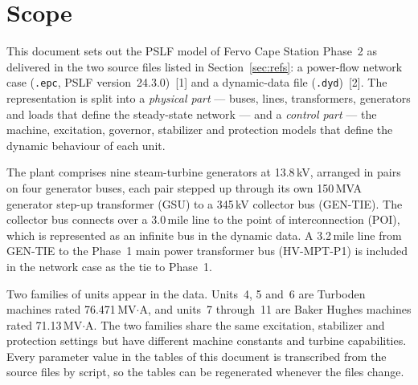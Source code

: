 \section{Scope}

This document sets out the PSLF model of Fervo Cape Station Phase~2 as delivered in
the two source files listed in Section~\ref{sec:refs}: a power-flow network case
(\texttt{.epc}, PSLF version~24.3.0)~[1] and a dynamic-data file (\texttt{.dyd})~[2].
The representation is split into a \emph{physical part} --- buses, lines, transformers,
generators and loads that define the steady-state network --- and a \emph{control
part} --- the machine, excitation, governor, stabilizer and protection models that
define the dynamic behaviour of each unit.

The plant comprises nine steam-turbine generators at 13.8\,kV, arranged in pairs on
four generator buses, each pair stepped up through its own 150\,MVA generator
step-up transformer (GSU) to a 345\,kV collector bus (GEN-TIE). The collector bus
connects over a 3.0\,mile line to the point of interconnection (POI), which is
represented as an infinite bus in the dynamic data. A 3.2\,mile line from GEN-TIE to
the Phase~1 main power transformer bus (HV-MPT-P1) is included in the network case
as the tie to Phase~1.

Two families of units appear in the data. Units~4, 5 and~6 are Turboden machines
rated 76.471\,MV$\cdot$A, and units~7 through~11 are Baker Hughes machines rated
71.13\,MV$\cdot$A. The two families share the same excitation, stabilizer and
protection settings but have different machine constants and turbine capabilities.
Every parameter value in the tables of this document is transcribed from the source
files by script, so the tables can be regenerated whenever the files change.
